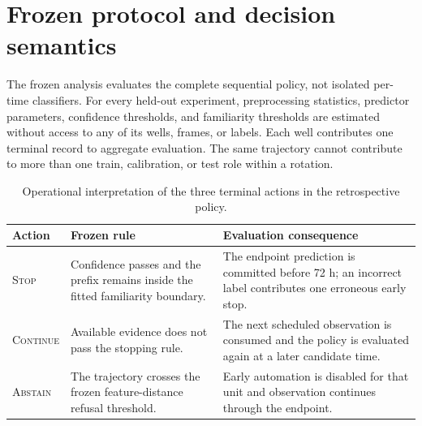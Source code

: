 \documentclass[11pt,twocolumn]{article}
\renewcommand{\arraystretch}{1.12}
\newcommand{\stopstate}{\textsc{Stop}\xspace}
\newcommand{\continuestate}{\textsc{Continue}\xspace}
\newcommand{\abstainstate}{\textsc{Abstain}\xspace}
\begin{document}
\clearpage
\appendix
\onecolumn
\renewcommand{\arraystretch}{1.30}

\section{Frozen protocol and decision semantics}

The frozen analysis evaluates the complete sequential policy, not isolated per-time classifiers.
For every held-out experiment, preprocessing statistics, predictor parameters, confidence
thresholds, and familiarity thresholds are estimated without access to any of its wells, frames,
or labels. Each well contributes one terminal record to aggregate evaluation. The same trajectory
cannot contribute to more than one train, calibration, or test role within a rotation.

\begin{table}[H]
\centering
\caption{Operational interpretation of the three terminal actions in the retrospective policy.}
\label{tab:actions}
\normalsize
\begin{tabularx}{\textwidth}{@{}l>{\raggedright\arraybackslash}p{}>{\raggedright\arraybackslash}X@{}}
\toprule
Action & Frozen rule & Evaluation consequence \\
\midrule
\stopstate & Confidence passes and the prefix remains inside the fitted familiarity boundary. &
The endpoint prediction is committed before 72 h; an incorrect label contributes one erroneous
early stop. \\
\continuestate & Available evidence does not pass the stopping rule. &
The next scheduled observation is consumed and the policy is evaluated again at a later candidate
time. \\
\abstainstate & The trajectory crosses the frozen feature-distance refusal threshold. &
Early automation is disabled for that unit and observation continues through the endpoint. \\
\bottomrule
\end{tabularx}
\end{table}
\end{document}

